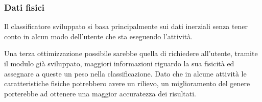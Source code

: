 \subsubsection{Dati fisici}
Il classificatore sviluppato si basa principalmente sui dati inerziali senza tener conto in alcun modo dell'utente 
che sta eseguendo l'attività.

\vspace{5mm} %

Una terza ottimizzazione possibile sarebbe quella di richiedere all'utente, tramite il modulo già sviluppato, maggiori 
informazioni riguardo la sua fisicità ed assegnare a queste un peso nella classificazione.
Dato che in alcune attività le caratteristiche fisiche potrebbero avere un rilievo, un miglioramento del genere porterebbe ad 
ottenere una maggior accuratezza dei risultati.